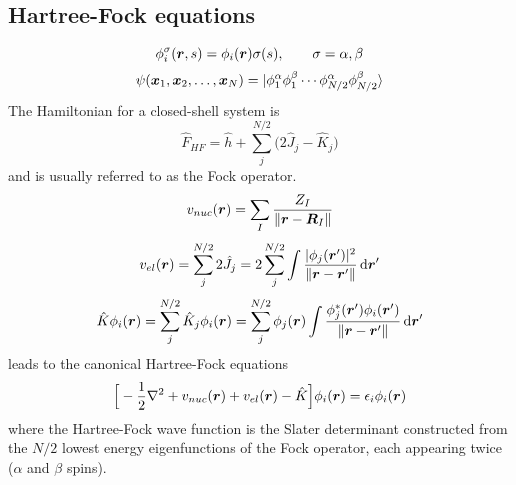 \subsection{Hartree-Fock equations}
\begin{equation}
    \phi_i^\sigma(\boldsymbol r,s) = \phi_i(\boldsymbol r)\sigma(s), \qquad \sigma = \alpha, \beta
\end{equation}
\begin{equation}
    \psi(\boldsymbol x_1,\boldsymbol x_2,\dots,\boldsymbol x_N) = 
    |\phi_1^\alpha\phi_1^\beta\cdots\phi_{N/2}^\alpha\phi_{N/2}^\beta\rangle
\end{equation}
The Hamiltonian for a closed-shell system is 
\begin{equation}
    \hat{F}_{HF} = \hat{h} + \sum_j^{N/2} \Big(2\hat{J}_j - \hat{K}_j\Big)
\end{equation}
and is usually referred to as the Fock operator.
\begin{equation}
    v_{nuc}(\boldsymbol r) = \sum_{I} \frac{Z_I}{\|\boldsymbol r - \boldsymbol R_I\|}
\end{equation}
\begin{equation}
    v_{el}(\boldsymbol r) = \sum_j^{N/2} 2\hat{J}_j = 2 \sum_j^{N/2} \int \frac{|\phi_j(\boldsymbol r')|^2}
	{\|\boldsymbol r - \boldsymbol r'\|} \,\mathrm{d} \boldsymbol r'
\end{equation}
\begin{equation}
    \hat{K}\phi_i(\boldsymbol r) = \sum_j^{N/2} \hat{K}_j \phi_i(\boldsymbol r) 
	= \sum_j^{N/2} \phi_j (\boldsymbol r) \int \frac{\phi_j^{\ast}(\boldsymbol r')\phi_i(\boldsymbol r')}
	    {\|\boldsymbol r - \boldsymbol r'\|} \,\mathrm{d} \boldsymbol r'
\end{equation}
leads to the canonical Hartree-Fock equations
\begin{equation}
    \Big[-\frac{1}{2}\nabla^2 + v_{nuc}(\boldsymbol r) + v_{el}(\boldsymbol r) - \hat{K}\Big]\phi_i(\boldsymbol r) 
	= \epsilon_i \phi_i(\boldsymbol r)
\end{equation}
where the Hartree-Fock wave function is the Slater determinant constructed from the $N/2$ lowest
energy eigenfunctions of the Fock operator, each appearing twice ($\alpha$ and $\beta$ spins).

